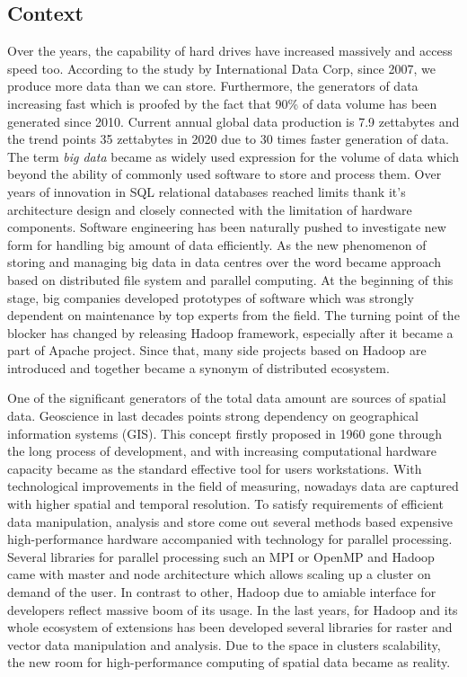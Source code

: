 \documentclass[a4paper,12pt,oneside]{report}
\begin{document}
	\subsection*{Context}
	Over the years, the capability of hard drives have increased massively and
	access speed too. According to the study by International Data Corp, since 2007,
	we produce more data than we can store. Furthermore, the generators of data 
	increasing fast which is proofed by the fact that 90\% of data volume has been
	generated since 2010. Current  annual global data production is  7.9 zettabytes
	and the trend points 35 zettabytes in 2020 due to 30 times faster generation of
	data.  
	The term \textit{big data} became as widely used expression for the volume of
	data which beyond the ability of commonly used software to store and process 
	them.   Over years of innovation in SQL relational databases reached limits
	thank it's architecture design and closely connected with the limitation of
	hardware components.  Software engineering has been naturally pushed to 
	investigate new form for handling big amount of data efficiently.  As  the new
	phenomenon   of storing and managing big data in data centres over the word
	became approach based on distributed file system and parallel computing. At the
	beginning of this stage, big companies developed prototypes of software which
	was strongly dependent on maintenance by top experts from the field.  The
	turning point of the blocker has changed by releasing  Hadoop framework,
	especially after it became a part of Apache project. Since that, many side
	projects based on Hadoop are introduced and together became a synonym of 
	distributed ecosystem.
	
	
	One of the significant generators of the total data amount are sources of
	spatial data.   Geoscience in last decades points strong dependency on
	geographical information systems (GIS). This concept firstly proposed in 1960
	gone through  the long process of development, and with increasing computational
	hardware capacity became as the standard  effective tool for users workstations.
	With technological improvements in the field of measuring, nowadays data are
	captured with higher spatial and temporal resolution. To satisfy requirements of
	efficient data manipulation, analysis and store come out several methods based
	expensive high-performance hardware accompanied with technology for parallel
	processing. Several libraries for parallel processing such an MPI or OpenMP and
	Hadoop came with master and node  architecture which allows scaling up a cluster
	on demand of the user. In contrast to other, Hadoop due to amiable interface for
	developers reflect massive boom of its usage. In the last years, for Hadoop and its
	whole ecosystem of extensions has been developed several libraries for raster
	and vector data manipulation and analysis. Due to the space in clusters
	scalability, the new room for high-performance computing of spatial data became
	as reality.
	
\end{document}
